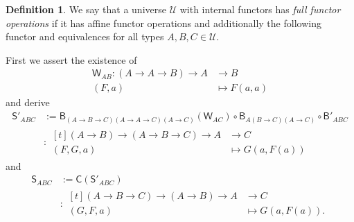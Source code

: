 \documentclass[a4paper]{article}
\theoremstyle{definition}
\newtheorem{definition}{Definition}[section]
\theoremstyle{remark}
\newcommand{\defn}{\emph}
\newcommand{\U}{\mathcal{U}}
\newcommand{\nm}{\mathsf}
\newcommand{\combinator}{\nm}
\newcommand{\compFun}{\combinator{B'}}
\newcommand{\revCompFun}{\combinator{B}}
\newcommand{\swapFun}{\combinator{C}}
\newcommand{\dupFun}{\combinator{W}}
\newcommand{\substFun}{\combinator{S'}}
\newcommand{\revSubstFun}{\combinator{S}}
\begin{document}
\begin{definition}
  We say that a universe $\U$ with internal functors has \defn{full functor
  operations} if it has affine functor operations and additionally the following functor
  and equivalences for all types $A,B,C \in \U.$

  First we assert the existence of
  \begin{align*}
    \dupFun_{AB} : (A \to A \to B) \to A &\to     B\\
                   (F,a)                 &\mapsto F(a,a)
  \end{align*}
  and derive
  \begin{align*}
    \substFun_{ABC} &:= \revCompFun_{(A{\to}B{\to}C)(A{\to}A{\to}C)(A{\to}C)}(\dupFun_{AC}) \circ
                        \revCompFun_{A(B{\to}C)(A{\to}C)} \circ
                        \compFun_{ABC}\\
                    &: \begin{aligned}[t]
                         (A \to B) \to (A \to B \to C) \to A &\to     C\\
                         (F,G,a)                             &\mapsto G(a,F(a))
                       \end{aligned}
  \end{align*}
  and
  \begin{align*}
    \revSubstFun_{ABC} &:= \swapFun(\substFun_{ABC})\\
                       &: \begin{aligned}[t]
                            (A \to B \to C) \to (A \to B) \to A &\to     C\\
                            (G,F,a)                             &\mapsto G(a,F(a)).
                          \end{aligned}
  \end{align*}


\end{definition}
\end{document}
